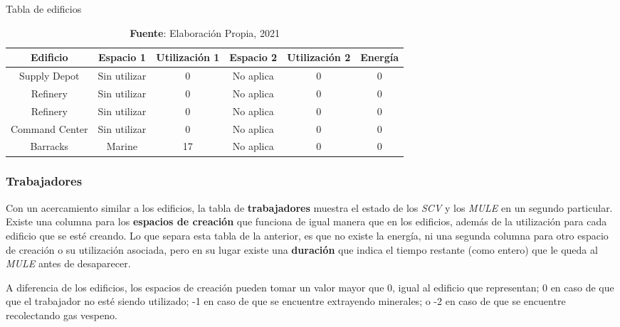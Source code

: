 \begin{table}[H]
\centering
\def\arraystretch{1.8}
\captionsetup{justification=centering}
\caption{Tabla de edificios}
\label{tab:5}
\begin{tabular}{|c|c|c|c|c|c|}
\hline
\textbf{Edificio} & \textbf{Espacio 1} & \textbf{Utilización 1} & \textbf{Espacio 2} & \textbf{Utilización 2} & \textbf{Energía} \\
\hline
Supply Depot & Sin utilizar & 0 & No aplica & 0 & 0 \\ \hline
Refinery & Sin utilizar & 0 & No aplica & 0 & 0 \\ \hline
Refinery & Sin utilizar & 0 & No aplica & 0 & 0 \\ \hline
Command Center & Sin utilizar & 0 & No aplica & 0 & 0 \\ \hline
Barracks & Marine & 17 & No aplica & 0 & 0 \\ \hline
\end{tabular}
\caption*{\textbf{Fuente}: Elaboración Propia, 2021}
\end{table}

\subsubsection{Trabajadores}

Con un acercamiento similar a los edificios, la tabla de \textbf{trabajadores} muestra el estado de los \textit{SCV} y los \textit{MULE} en un segundo particular. Existe una columna para los \textbf{espacios de creación} que funciona de igual manera que en los edificios, además de la utilización para cada edificio que se esté creando. Lo que separa esta tabla de la anterior, es que no existe la energía, ni una segunda columna para otro espacio de creación o su utilización asociada, pero en su lugar existe una \textbf{duración} que indica el tiempo restante (como entero) que le queda al \textit{MULE} antes de desaparecer.

A diferencia de los edificios, los espacios de creación pueden tomar un valor mayor que 0, igual al edificio que representan; 0 en caso de que que el trabajador no esté siendo utilizado; -1 en caso de que se encuentre extrayendo minerales; o -2 en caso de que se encuentre recolectando gas vespeno.

